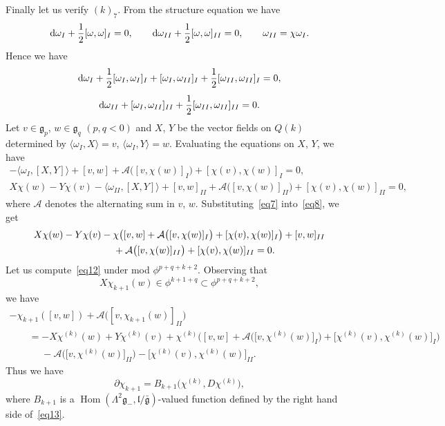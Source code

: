 \documentclass[10pt,a4paper]{amsart}
\newcommand{\geneg}{\mathfrak g _-}
\newcommand{\gebar}{\bar{\mathfrak g}}
\newcommand{\g}{\mathfrak g}
\newcommand{\lf}{\mathfrak l}
\newcommand{\Hom}{\operatorname{Hom}}
\numberwithin{equation}{section}
\begin{document}
Finally let us verify $(k)_7$. From the structure equation we have
\begin{gather*}
{\rm d}\omega _I + \frac12 [\omega, \omega]_I = 0, \qquad
{\rm d}\omega _{II} + \frac12 [\omega, \omega]_{II} = 0, \qquad
\omega _{II} = \chi \omega _I.
\end{gather*}
Hence we have
\begin{gather}
{\rm d}\omega _{I} + \frac12 [\omega_{I}, \omega_{I}]_{I} + [\omega_{I}, \omega_{II}]_{I}
+\frac12 [\omega_{II}, \omega_{II}]_{I} = 0,
\\[1ex]
{\rm d}\omega _{II} + [\omega_{I}, \omega_{II}]_{II}
+\frac12 [\omega_{II}, \omega_{II}]_{II} =0.
\end{gather}
Let $v \in \g_p$, $w \in \g_q$ $(p, q < 0 )$ and $X$, $Y$ be the vector fields
on $Q(k)$ determined by $ \langle \omega_I, X\rangle = v$, $\langle \omega _I, Y \rangle = w$.
Evaluating the equations on $X$, $Y$, we have
\begin{gather}
-\langle \omega _I, [X, Y]\rangle + [v, w] + \mathcal A \big([v, \chi(w)]_I \big) + [\chi(v), \chi(w)]_I = 0, \label{eq7}
\\
X\chi(w) - Y \chi(v) - \langle \omega_{II} , [X,Y] \rangle
+[v, w]_{II}+ \mathcal A \big([v, \chi(w) ]_{II}\big) + [\chi (v) , \chi (w ) ] _{II} = 0,\label{eq8}
\end{gather}
where $\mathcal A$ denotes the alternating sum in $v$, $w$.
Substituting~\eqref{eq7} into~\eqref{eq8}, we get
\begin{gather}
X\chi(w) - Y \chi(v) -\chi \big( [v, w] + \mathcal A \big([v, \chi(w) ]_I \big) + [\chi(v), \chi(w)]_I\big)+ [v, w]_{II} \nonumber
\\ \hphantom{X\chi(w) }
{}+ \mathcal A \big([v, \chi(w) ]_{II}\big) +
[\chi (v), \chi (w )]_{II}= 0.\label{eq12}
\end{gather}
Let us compute~\eqref{eq12} under mod $\phi^{p+q+k+2}$.
Observing that
\[
X \chi _{k+1} (w) \in \phi^{k+1+q} \subset \phi^{p+q+k+2},
\]
we have
\begin{gather}
-\chi_{k+1} ( [v, w]) + \mathcal A \big([ v, \chi _{k+1} (w)] _{II} \big)
\nonumber
\\ \qquad
{}= -X\chi^{(k)} (w) + Y \chi ^{(k)}(v)+\chi ^{(k)} \big( [v, w] + \mathcal A \big(\big[v, \chi ^{(k)} (w) \big]_{I}\big) + \big[\chi ^{(k)} (v), \chi ^{(k)} (w)\big]_I\big) \nonumber
\\ \qquad\phantom{=}
{}- \mathcal A \big( \big[v, \chi^ {(k)}(w)\big]_{II} \big)- \big[\chi^{(k)}(v), \chi^{(k)}(w)\big]_{II}.\label{eq13}
\end{gather}
Thus we have
\begin{equation}\label{eq:chi}
\partial \chi _{k+1} = B_{k+1} \big( \chi ^{(k)}, D\chi ^{(k)} \big),
\end{equation}
where $B_{k+1} $ is a $\Hom\left(\Lambda ^2 \geneg , \lf / \gebar \right)$-valued
function defined by the right hand side of~\eqref{eq13}.
\end{document}
